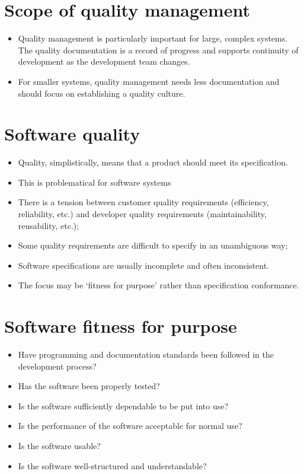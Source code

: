 \section {Scope of quality management}
\begin{itemize}
\item Quality management is particularly important for large, complex systems. The quality documentation is a record of progress and supports continuity of development as the development team changes.

\item For smaller systems, quality management needs less documentation and should focus on establishing a quality culture.
\end{itemize}

\section {Software quality}
\begin{itemize}
\item Quality, simplistically, means that a product should meet its specification.

\item This is problematical for software systems

  \item There is a tension between customer quality requirements (efficiency, reliability, etc.) and developer quality requirements (maintainability, reusability, etc.);
  \item Some quality requirements are difficult to specify in an unambiguous way;
  \item Software specifications are usually incomplete and often inconsistent.

\item The focus may be ‘fitness for purpose’ rather than specification conformance.

\end{itemize}

\section {Software fitness for purpose}
\begin{itemize}

\item Have programming and documentation standards been followed in the development process?

\item Has the software been properly tested?

\item Is the software sufficiently dependable to be put into use?

\item Is the performance of the software acceptable for normal use?

\item Is the software usable?

\item Is the software well-structured and understandable?
\end{itemize}

